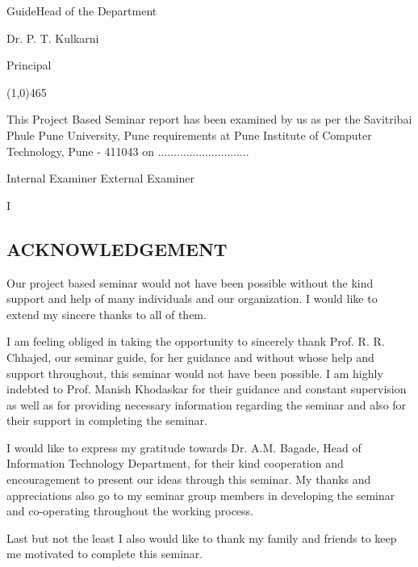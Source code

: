\documentclass[a4paper, 12pt]{article}
\begin{document}
\begin{titlepage}
\hspace{20pt}Guide\hspace{220pt}Head of the Department

\begin{center}\textcolor[HTML]{FF0000}{Dr.  P. T. Kulkarni}\end{center}
\begin{center}
Principal
\end{center}
\begin{center}
\line(1,0){465}
\end{center}
{\large This Project Based Seminar report has been examined by us as per the
Savitribai Phule Pune University, Pune requirements at \textcolor[HTML]{FF0000}{Pune Institute of Computer Technology, Pune - 411043} on ............................. }
\linebreak
\linebreak
\linebreak
\linebreak
\linebreak
\linebreak
{\raggedright
{\large Internal Examiner \hspace{170pt}External Examiner}
}
\end{titlepage} 
\newpage
{}
\begin{center}
    I
\end{center}
\begin{center}
    \section*{ACKNOWLEDGEMENT}
\end{center}
\hspace{0.5cm}Our project based seminar would not have been possible without the kind support and help of many individuals and our organization. I would like to extend my sincere thanks to all of them.
\vspace{0.25cm}
\par I am feeling obliged in taking the opportunity to sincerely thank Prof. R. R. Chhajed, our seminar guide, for her guidance and without whose help and support throughout, this seminar would not have been possible. I am highly indebted to Prof. Manish Khodaskar for their guidance and constant supervision as well as for providing necessary information regarding the seminar and also for their support in completing the seminar.
\vspace{0.25cm}
\par I would like to express my gratitude towards Dr. A.M. Bagade, Head of Information Technology Department, for their kind cooperation and encouragement to present our ideas through this seminar. My thanks and appreciations also go to my seminar group members in developing the seminar and co-operating throughout the working process.
\vspace{0.25cm}
\par Last but not the least I also would like to thank my family and friends to keep me motivated to complete this seminar.
\end{document}
